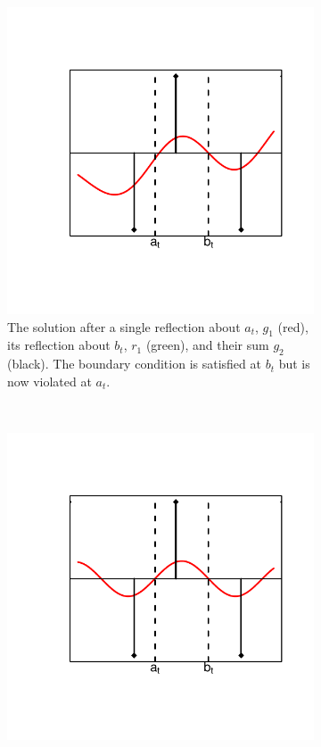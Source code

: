 \begin{figure}[htbp]
\begin{subfigure}[t]{0.3\textwidth}
                \includegraphics[width=\textwidth]{g2.pdf}
                \caption{The solution after a single reflection about $a_t$, $g_1$ (red), its reflection about $b_t$, $r_1$ (green), and their sum $g_2$ (black). The boundary condition is satisfied at $b_t$ but is now violated at $a_t$.}
                \label{fig:g2}
        \end{subfigure}
        ~ %
        \begin{subfigure}[t]{0.3\textwidth}
                \includegraphics[width=\textwidth]{g3.pdf}

\end{subfigure}
\end{figure}
